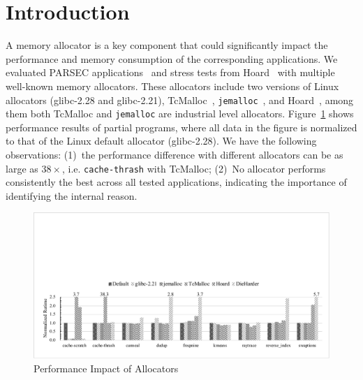 

\section{Introduction}

A memory allocator is a key component that could significantly impact the performance and memory consumption of the corresponding applications. We evaluated PARSEC applications~\cite{parsec} and stress tests from Hoard~\cite{Hoard} with multiple well-known memory allocators. These allocators include two versions of Linux allocators (glibc-2.28 and glibc-2.21), TcMalloc~\cite{tcmalloc}, \texttt{jemalloc}~\cite{jemalloc}, and Hoard~\cite{Hoard}, among them both TcMalloc and \texttt{jemalloc} are industrial level allocators. Figure~\ref{fig:motivation} shows performance results of partial programs, where all data in the figure is normalized to that of the Linux default allocator (glibc-2.28). We have the following observations: (1)~the performance difference with different allocators can be as large as $38\times$, i.e. \texttt{cache-thrash} with TcMalloc; (2)~No allocator performs consistently the best across all tested applications, indicating the importance of identifying the internal reason.

\begin{figure}[!ht]
\centering
\includegraphics[width=0.98\columnwidth]{figures/motivation}
\caption{Performance Impact of Allocators\label{fig:motivation}}
\end{figure}

